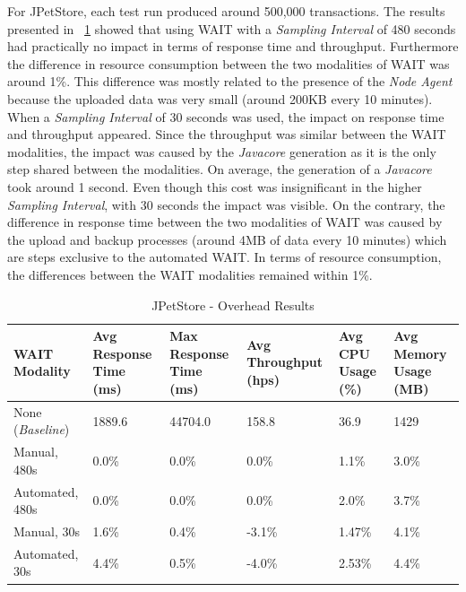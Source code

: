 \documentclass[runningheads,a4paper]{llncs}
\begin{document}
For JPetStore, each test run produced around 500,000 transactions. The results
presented in \tablename ~\ref{PetStore1} showed that using WAIT with a
\emph{Sampling Interval} of 480 seconds had practically no impact in terms of
response time and throughput. Furthermore the difference in resource consumption
between the two modalities of WAIT was around 1\%.  This difference was
mostly related to the presence of the \emph{Node Agent} because the uploaded
data was very small (around 200KB every 10 minutes). When a
\emph{Sampling Interval} of 30 seconds was used, the impact on response time
and throughput appeared. Since the throughput was similar between the WAIT
modalities, the impact was caused by the \emph{Javacore} generation as it is
the only step shared between the modalities. On average, the generation of a
\emph{Javacore} took around 1 second. Even though this cost was insignificant in
the higher \emph{Sampling Interval}, with 30 seconds the impact was visible.
On the contrary, the difference in response time between the two modalities of
WAIT was caused by the upload and backup processes (around 4MB of data every 10
minutes) which are steps exclusive to the automated WAIT.
In terms of resource consumption, the differences between the WAIT modalities
remained within 1\%.

\vspace{-5pt}
\begin{table}[!h]
\caption{JPetStore - Overhead Results}
\label{PetStore1}
\centering
\begin{tabular}{p{}|p{}|p{}|p{}|p{}|p{}}
\hline
\bfseries WAIT Modality & \bfseries Avg Response Time (ms)& \bfseries Max
Response Time (ms)& \bfseries Avg Throughput (hps)& \bfseries Avg CPU Usage
(\%) & \bfseries Avg Memory Usage (MB)\\
\hline
None (\emph{Baseline}) 	& 1889.6	& 44704.0	& 158.8 	& 36.9 		& 1429\\
Manual, 480s 			& 0.0\% 	& 0.0\%		& 0.0\%		& 1.1\% 	& 3.0\%\\
Automated, 480s 		& 0.0\%		& 0.0\%		& 0.0\% 	& 2.0\% 	& 3.7\%\\
Manual, 30s 			& 1.6\%		& 0.4\%		& -3.1\% 	& 1.47\% 	& 4.1\%\\
Automated, 30s 			& 4.4\%		& 0.5\%		& -4.0\% 	& 2.53\% 	& 4.4\%\\
\hline
\end{tabular}
\end{table}
\vspace{-5pt}
\end{document}
